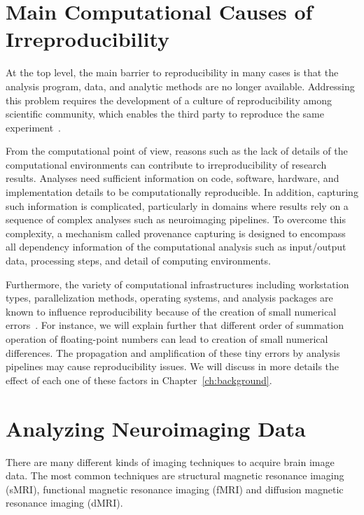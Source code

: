 \section{Main Computational Causes of Irreproducibility} 

At the top level, the main barrier to reproducibility in many cases is 
that the analysis program, data, and analytic methods are no longer 
available. Addressing this problem requires the development of a culture of 
reproducibility among scientific community, which enables the third 
party to reproduce the same experiment~\cite{peng2011reproducible, 
stodden2016enhancing}. 

From the computational point of view, reasons such as the lack of 
details of the computational environments can contribute to 
irreproducibility of research results. Analyses need sufficient 
information on code, software, hardware, and implementation details to 
be computationally reproducible. In addition, capturing such 
information is complicated, particularly in domains where results rely 
on a sequence of complex analyses such as neuroimaging pipelines. 
To overcome this complexity, a mechanism called provenance capturing is
designed to encompass all dependency information of the computational 
analysis such as input/output data, processing steps, and 
detail of computing environments. 

Furthermore, the variety of computational infrastructures including 
workstation types, parallelization methods, operating systems, and 
analysis packages are known to influence reproducibility because of the 
creation of small numerical errors~\cite{Gronenschild2012, 
diethelm2012limits, Glatard2015}. 
For instance, we will explain further that different order of 
summation operation of floating-point numbers can lead to creation of 
small numerical differences. 
The propagation and amplification of these tiny 
errors by analysis pipelines may cause reproducibility issues. We 
will discuss in more details the effect of each one of these factors in Chapter~\ref{ch:background}.

\section{Analyzing Neuroimaging Data}

There are many different kinds of imaging techniques to acquire 
brain image data. The most common techniques are structural magnetic 
resonance imaging (sMRI), functional magnetic resonance imaging (fMRI) 
and diffusion magnetic resonance imaging (dMRI).

